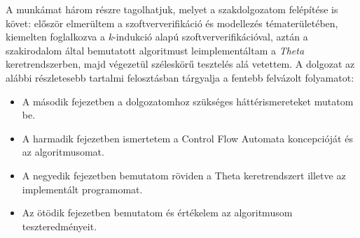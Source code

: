\newline
\newline
A munkámat három részre tagolhatjuk, melyet a szakdolgozatom felépítése is követ: először elmerültem a szoftververifikáció és modellezés tématerületében, kiemelten foglalkozva a \emph{k}-indukció alapú szoftververifikációval, aztán a szakirodalom által bemutatott algoritmust leimplementáltam a \emph{Theta} keretrendszerben, majd végezetül széleskörű tesztelés alá vetettem.
\newline
\newline
A dolgozat az alábbi részletesebb tartalmi felosztásban tárgyalja a fentebb felvázolt folyamatot:
\begin{itemize}
	\item A második fejezetben a dolgozatomhoz szükséges háttérismereteket mutatom be.
	\item A harmadik fejezetben ismertetem a Control Flow Automata koncepcióját és az algoritmusomat.
	\item A negyedik fejezetben bemutatom röviden a Theta keretrendszert illetve az implementált programomat.
	\item Az ötödik fejezetben bemutatom és értékelem az algoritmusom teszteredményeit.
\end{itemize}